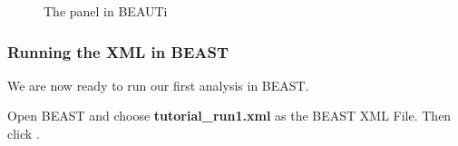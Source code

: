 \documentclass[11pt]{article}
\begin{document}
\begin{figure}[!h]
\centering
{}
\caption{\small The  panel in BEAUTi}
\label{fig:beauti_run1}
\end{figure}

\bigskip
\subsubsection{Running the XML in BEAST}

We are now ready to run our first analysis in BEAST.

\begin{framed}
Open BEAST and choose \textbf{tutorial\_run1.xml} as the BEAST XML File. Then click .
\end{framed}
\end{document}
